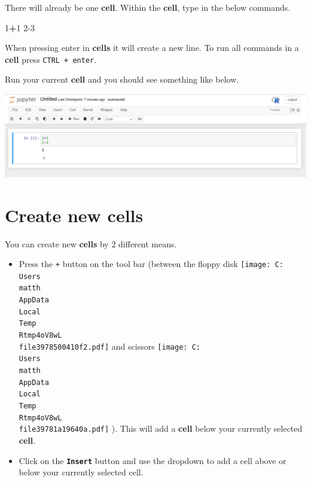 \documentclass[
]{book}
\newenvironment{Shaded}{\begin{snugshade}}{\end{snugshade}}
\newcommand{\DecValTok}[1]{\textcolor[rgb]{0.00,0.00,0.81}{#1}}
\newcommand{\SpecialCharTok}[1]{\textcolor[rgb]{0.81,0.36,0.00}{\textbf{#1}}}
\providecommand{\tightlist}{%
  \setlength{\itemsep}{0pt}\setlength{\parskip}{0pt}}
\begin{document}
There will already be one \textbf{cell}. Within the \textbf{cell}, type in the below commands.

\begin{Shaded}
\begin{Highlighting}[]
\DecValTok{1}\SpecialCharTok{+}\DecValTok{1}
\DecValTok{2{-}3}
\end{Highlighting}
\end{Shaded}

When pressing enter in \textbf{cells} it will create a new line. To run all commands in a \textbf{cell} press \texttt{CTRL\ +\ enter}.

Run your current \textbf{cell} and you should see something like below.

\includegraphics{figures/jupyter_notebook_example_3.png}

\hypertarget{create-new-cells}{%
\section{Create new cells}\label{create-new-cells}}

You can create new \textbf{cells} by 2 different means.

\begin{itemize}
\tightlist
\item
  Press the \texttt{+} button on the tool bar (between the floppy disk
  \protect\texttt{[image: C:\\Users\\matth\\AppData\\Local\\Temp\\Rtmp4oV8wL\\file3978500410f2.pdf]}
  and scissors
  \protect\texttt{[image: C:\\Users\\matth\\AppData\\Local\\Temp\\Rtmp4oV8wL\\file39781a19640a.pdf]}
  ). This will add a \textbf{cell} below your currently selected \textbf{cell}.
\item
  Click on the \textbf{\texttt{Insert}} button and use the dropdown to add a cell above or below your currently selected cell.
\end{itemize}
\end{document}
